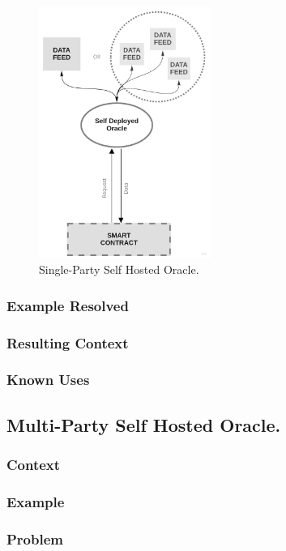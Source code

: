 \begin{figure}[t]
  \begin{center}
    \leavevmode
    \includegraphics[width=0.5\textwidth]{figures/oraclearch3.jpg}
    \caption{Single-Party Self Hosted Oracle.}
    \label{fig:/figures/paper-screening}
  \end{center}
\end{figure}


\subsubsection{Example Resolved}
\subsubsection{Resulting Context}
\subsubsection{Known Uses}

\subsection{Multi-Party Self Hosted Oracle.}

\subsubsection{Context}
\subsubsection{Example}
\subsubsection{Problem}
